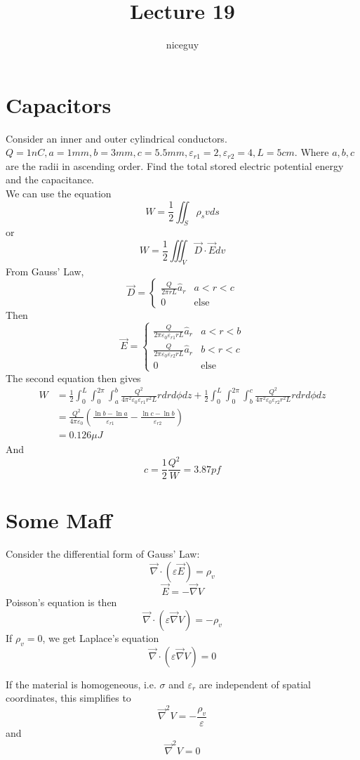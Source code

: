 \documentclass[12pt]{article}
\author{niceguy}
\title{Lecture 19}
\begin{document}
\maketitle

\section{Capacitors}

\begin{ex}

	Consider an inner and outer cylindrical conductors. $Q = 1\unit{nC}, a = 1\unit{mm}, b = 3\unit{mm}, c = 5.5\unit{mm}, \varepsilon_{r1} = 2, \varepsilon_{r2} = 4, L = 5\unit{cm}$. Where $a,b,c$ are the radii in ascending order. Find the total stored electric potential energy and the capacitance. \\
	We can use the equation
	$$W = \frac{1}{2} \iint_S \rho_s vds$$
	or
	$$W = \frac{1}{2} \iiint_V \vec{D} \cdot \vec{E} dv$$
	From Gauss' Law,
	$$\vec{D} = \begin{cases} \frac{Q}{2\pi rL}\hat{a}_r & a < r < c \\ 0 & \text{else} \end{cases}$$
	Then
	$$\vec{E} = \begin{cases} \frac{Q}{2\pi \varepsilon_0\varepsilon_{r1} rL}\hat{a}_r & a < r < b \\ \frac{Q}{2\pi \varepsilon_0\varepsilon_{r2} rL}\hat{a}_r & b < r < c \\ 0 & \text{else} \end{cases}$$
	The second equation then gives
	\begin{align*}
		W &= \frac{1}{2} \int_0^L \int_0^{2\pi} \int_a^b \frac{Q^2}{4\pi^2 \varepsilon_0\varepsilon_{r1} r^2L} rdrd\phi dz + \frac{1}{2} \int_0^L \int_0^{2\pi} \int_b^c \frac{Q^2}{4\pi^2 \varepsilon_0\varepsilon_{r2} r^2L} rdrd\phi dz \\
		  &= \frac{Q^2}{4\pi\varepsilon_0}\left(\frac{\ln b - \ln a}{\varepsilon_{r1}} - \frac{\ln c - \ln b}{\varepsilon_{r2}}\right) \\
		  &= 0.126\unit{\mu J}
	\end{align*}
	And
	$$c = \frac{1}{2} \frac{Q^2}{W} = 3.87\unit{pf}$$
\end{ex}

\section{Some Maff}

Consider the differential form of Gauss' Law:
$$\vec{\nabla} \cdot (\varepsilon\vec{E}) = \rho_v$$
$$\vec{E} = -\vec{\nabla} V$$
Poisson's equation is then
$$\vec{\nabla}\cdot(\varepsilon\vec{\nabla}V) = -\rho_v$$
If $\rho_v = 0$, we get Laplace's equation
$$\vec{\nabla}\cdot(\varepsilon\vec{\nabla}V) = 0$$

If the material is homogeneous, i.e. $\sigma$ and $\varepsilon_r$ are independent of spatial coordinates, this simplifies to
$$\vec{\nabla}^2V = -\frac{\rho_v}{\varepsilon}$$
and
$$\vec{\nabla}^2V = 0$$
\end{document}
